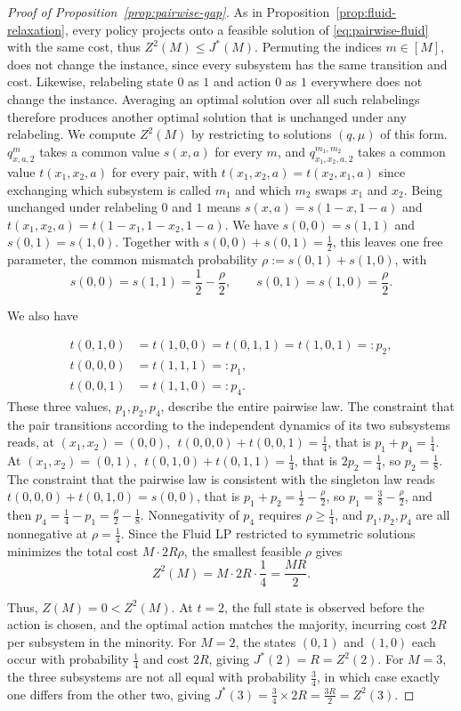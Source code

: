 \documentclass{article}
\begin{document}
\begin{proof}[Proof of Proposition~\ref{prop:pairwise-gap}]
As in Proposition~\ref{prop:fluid-relaxation}, every policy projects onto a feasible solution of \ref{eq:pairwise-fluid} with the same cost, thus $Z^{2}(M) \leq J^*(M)$. Permuting the indices $m \in [M]$, does not change the instance, since every subsystem has the same transition and cost. Likewise, relabeling state $0$ as $1$ and action $0$ as $1$ everywhere does not change the instance. Averaging an optimal solution over all such relabelings therefore produces another optimal solution that is unchanged under any relabeling. We compute $Z^{2}(M)$ by restricting to solutions $(q,\mu)$ of this form. $q^m_{x,a,2}$ takes a common value $s(x,a)$ for every $m$, and $q^{m_1,m_2}_{x_1,x_2,a,2}$ takes a common value $t(x_1,x_2,a)$ for every pair, with $t(x_1,x_2,a)=t(x_2,x_1,a)$ since exchanging which subsystem is called $m_1$ and which $m_2$ swaps $x_1$ and $x_2$. Being unchanged under relabeling $0$ and $1$ means $s(x,a)=s(1-x,1-a)$ and $t(x_1,x_2,a)=t(1-x_1,1-x_2,1-a)$. We have $s(0,0)=s(1,1)$ and $s(0,1)=s(1,0)$. Together with $s(0,0)+s(0,1)=\frac12$, this leaves one free parameter, the common mismatch probability $\rho:=s(0,1)+s(1,0)$, with
$$
s(0,0)=s(1,1)=\frac12-\frac\rho2, \qquad s(0,1)=s(1,0)=\frac\rho2.
$$

We also have

\begin{align*}
t(0,1,0)&=t(1,0,0)=t(0,1,1)=t(1,0,1) =: p_2,\\
t(0,0,0)&=t(1,1,1)=:p_1,\\
t(0,0,1)&=t(1,1,0)=:p_4.
\end{align*}
These three values, $p_1,p_2,p_4$, describe the entire pairwise law. The constraint that the pair transitions according to the independent dynamics of its two subsystems reads, at $(x_1,x_2)=(0,0)$, $\;t(0,0,0)+t(0,0,1)=\frac14$, that is $p_1+p_4=\frac14$. At $(x_1,x_2)=(0,1)$, $\;t(0,1,0)+t(0,1,1)=\frac14$, that is $2p_2=\frac14$, so $p_2=\frac18$. The constraint that the pairwise law is consistent with the singleton law reads $t(0,0,0)+t(0,1,0)=s(0,0)$, that is $p_1+p_2=\frac12-\frac\rho2$, so $p_1=\frac38-\frac\rho2$, and then $p_4=\frac14-p_1=\frac\rho2-\frac18$. Nonnegativity of $p_4$ requires $\rho \geq \frac14$, and $p_1,p_2,p_4$ are all nonnegative at $\rho=\frac14$. Since the Fluid LP restricted to symmetric solutions minimizes the total cost $M \cdot 2R\rho$, the smallest feasible $\rho$ gives
$$
Z^{2}(M) = M\cdot2R\cdot\frac14 = \frac{MR}{2}.
$$

Thus, $Z(M) = 0 < Z^{2}(M)$. At $t=2$, the full state is observed before the action is chosen, and the optimal action matches the majority, incurring cost $2R$ per subsystem in the minority. For $M=2$, the states $(0,1)$ and $(1,0)$ each occur with probability $\frac14$ and cost $2R$, giving $J^*(2)=R=Z^{2}(2)$. For $M=3$, the three subsystems are not all equal with probability $\frac34$, in which case exactly one differs from the other two, giving $J^*(3)=\frac34\times2R=\frac{3R}2=Z^{2}(3)$.
\end{proof}
\end{document}
